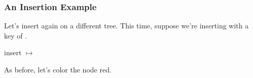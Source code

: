 \documentclass[aspectratio=169]{beamer}
\begin{document}
\begin{frame}
  \frametitle{An Insertion Example}

  Let's insert again on a different tree. This time, suppose we're inserting
  with a key of .

  \pause
  \vspace{\fill}

  \begin{center}
    \begin{minipage}{0.33\textwidth}
      \begin{adjustbox}{center}
      \end{adjustbox}
    \end{minipage}
    \pause
    \begin{minipage}{0.15\textwidth}
      \begin{center}
        insert  $\mapsto$
      \end{center}
    \end{minipage}
    \begin{minipage}{0.33\textwidth}
        \begin{adjustbox}{center}
        \end{adjustbox}
    \end{minipage}
  \end{center}

  \pause
  \vspace{\fill}

  As before, let's color the node red.
\end{frame}
\end{document}
